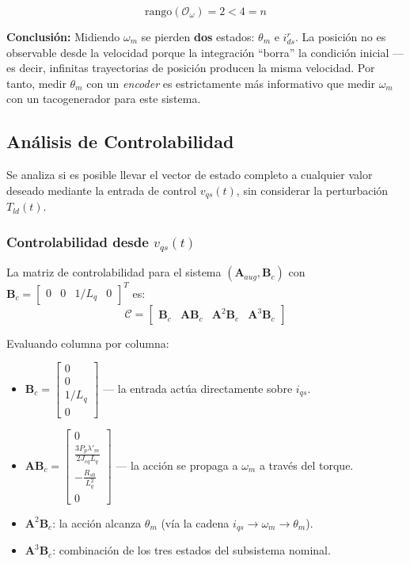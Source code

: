 \documentclass[12pt, a4paper,journal, onecolumn, compsoc]{IEEEtran}
\begin{document}
\begin{equation}
    \text{rango}(\mathcal{O}_\omega) = 2 < 4 = n
\end{equation}

\textbf{Conclusión:} Midiendo $\omega_m$ se pierden \textbf{dos} estados: $\theta_m$ e $i_{ds}^r$. La posición no es observable desde la velocidad porque la integración ``borra'' la condición inicial ---es decir, infinitas trayectorias de posición producen la misma velocidad. Por tanto, medir $\theta_m$ con un \textit{encoder} es estrictamente más informativo que medir $\omega_m$ con un tacogenerador para este sistema.

\subsection{Análisis de Controlabilidad}
Se analiza si es posible llevar el vector de estado completo a cualquier valor deseado mediante la entrada de control $v_{qs}(t)$, sin considerar la perturbación $T_{ld}(t)$.

\subsubsection{Controlabilidad desde \texorpdfstring{$v_{qs}(t)$}{v_qs(t)}}
La matriz de controlabilidad para el sistema $(\mathbf{A}_{aug}, \mathbf{B}_c)$ con $\mathbf{B}_c = \begin{bmatrix} 0 & 0 & 1/L_q & 0 \end{bmatrix}^T$ es:
\begin{equation}
    \mathcal{C} = \begin{bmatrix} \mathbf{B}_c & \mathbf{A}\mathbf{B}_c & \mathbf{A}^2\mathbf{B}_c & \mathbf{A}^3\mathbf{B}_c \end{bmatrix}
\end{equation}

Evaluando columna por columna:
\begin{itemize}
    \item $\mathbf{B}_c = \begin{bmatrix} 0 \\ 0 \\ 1/L_q \\ 0 \end{bmatrix}$ --- la entrada actúa directamente sobre $i_{qs}$.
    \item $\mathbf{A}\mathbf{B}_c = \begin{bmatrix} 0 \\ \frac{3P_p\lambda'_m}{2J_{eq}L_q} \\ -\frac{R_{s0}}{L_q^2} \\ 0 \end{bmatrix}$ --- la acción se propaga a $\omega_m$ a través del torque.
    \item $\mathbf{A}^2\mathbf{B}_c$: la acción alcanza $\theta_m$ (vía la cadena $i_{qs} \to \omega_m \to \theta_m$).
    \item $\mathbf{A}^3\mathbf{B}_c$: combinación de los tres estados del subsistema nominal.
\end{itemize}
\end{document}
